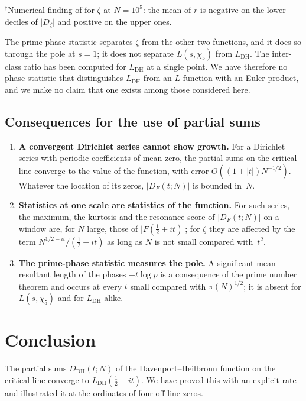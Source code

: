 \documentclass[11pt]{amsart}
\theoremstyle{definition}
\theoremstyle{remark}
\renewcommand{\DH}{\mathrm{DH}}
\newcommand{\abs}[1]{\lvert #1 \rvert}
\begin{document}
\noindent$^\dagger$Numerical finding of \cite{TrejoSignNote} for $\zeta$ at
$N=10^5$: the mean of $r$ is negative on the lower deciles of $\abs{D_\zeta}$
and positive on the upper ones.

\medskip
The prime-phase statistic separates $\zeta$ from the other two functions,
and it does so through the pole at $s=1$; it does not separate
$L(s,\chi_5)$ from $L_{\DH}$.  The inter-class ratio has been computed for
$L_{\DH}$ at a single point.  We have therefore no phase statistic that
distinguishes $L_{\DH}$ from an $L$-function with an Euler product, and we
make no claim that one exists among those considered here.

\subsection{Consequences for the use of partial sums}

\begin{enumerate}
\item \textbf{A convergent Dirichlet series cannot show growth.}  For a
  Dirichlet series with periodic coefficients of mean zero, the partial
  sums on the critical line converge to the value of the function, with
  error $O((1+\abs t)N^{-1/2})$.  Whatever the location of its zeros,
  $\abs{D_F(t;N)}$ is bounded in~$N$.

\item \textbf{Statistics at one scale are statistics of the function.}
  For such series, the maximum, the kurtosis and the resonance score of
  $\abs{D_F(t;N)}$ on a window are, for $N$ large, those of
  $\abs{F(\tfrac12+it)}$; for $\zeta$ they are affected by the term
  $N^{1/2-it}/(\tfrac12-it)$ as long as $N$ is not small compared
  with~$t^2$.

\item \textbf{The prime-phase statistic measures the pole.}  A significant
  mean resultant length of the phases $-t\log p$ is a consequence of the
  prime number theorem and occurs at every $t$ small compared with
  $\pi(N)^{1/2}$; it is absent for $L(s,\chi_5)$ and for $L_{\DH}$ alike.
\end{enumerate}

\section{Conclusion}\label{sec:conclusion}

The partial sums $D_{\DH}(t;N)$ of the Davenport--Heilbronn function on the
critical line converge to $L_{\DH}(\tfrac12+it)$.  We have proved this
with an explicit rate and illustrated it at the ordinates of four off-line
zeros.
\end{document}
